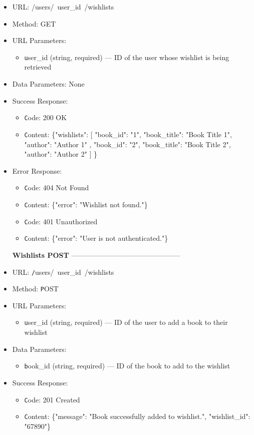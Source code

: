 \begin{itemize}
\item URL: /users/\ user\_id\  /wishlists  
\item Method:  GET  
\item URL Parameters:
\begin{itemize}  
  \item \texttt user\_id   (string, required) — ID of the user whose wishlist is being retrieved
\end{itemize}  
\item Data Parameters: None
\item Success Response:
\begin{itemize}  
  \item \texttt Code: 200 OK  
  \item \texttt Content: \{"wishlists": [
    {
      "book\_id": "1",
      "book\_title": "Book Title 1",
      "author": "Author 1"
    },
    {
      "book\_id": "2",
      "book\_title": "Book Title 2",
      "author": "Author 2"
    }
  ]
\}
\end{itemize} 

\item Error Response:
\begin{itemize}  
  \item \texttt Code: 404 Not Found  
  \item \texttt Content: \{"error": "Wishlist not found."\}  
  \item \texttt Code: 401 Unauthorized  
  \item \texttt Content: \{"error": "User is not authenticated."\} 
\end{itemize} 

\item[\textbf{Wishlists POST}] -----------------------------------------------

\item URL: \texttt /users/\ user\_id\  /wishlists  
\item Method: \texttt POST  
\item URL Parameters: 
\begin{itemize}
\item \texttt user\_id   (string, required) — ID of the user to add a book to their wishlist
\end{itemize}  
\item Data Parameters:
\begin{itemize}  
  \item \texttt book\_id   (string, required) — ID of the book to add to the wishlist
\end{itemize}  
\item Success Response:
\begin{itemize} 
  \item \texttt Code: 201 Created  
  \item \texttt Content: \{"message": "Book successfully added to wishlist.",
    "wishlist\_id": "67890"\}
\end{itemize}    
 

\end{itemize}
